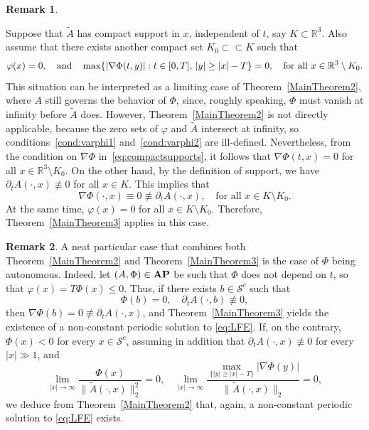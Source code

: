 \documentclass{article}
\newcommand{\R}{\mathbb{R}}
\newcommand{\boS}{\mathcal{S}}
\newcommand{\AP}{\textnormal{\textbf{AP}}}
\theoremstyle{definition}
\newtheorem{remark}{Remark}[section]
\begin{document}
\begin{remark}\label{Rem-Compact support}

Suppose that $\tilde A$ has compact support in $x$, independent of $t$, say $K \subset \mathbb{R}^3$. Also assume that there exists another compact set $K_0 \subset\subset K$ such that
\begin{equation}\label{eq:compactsupports}
\varphi(x) = 0, \quad\hbox{and}\quad \max\{|\nabla\Phi(t, y)| : t \in [0, T],\, |y| \geq |x| - T\} = 0,\quad\hbox{for all }x\in\R^3\setminus K_0.
\end{equation}
This situation can be interpreted as a limiting case of Theorem~\ref{MainTheorem2}, where $A$ still governs the behavior of $\Phi$, since, roughly speaking, $\Phi$ must vanish at infinity before $\tilde A$ does. However, Theorem~\ref{MainTheorem2} is not directly applicable, because the zero sets of $\varphi$ and $\tilde A$ intersect at infinity, so conditions~\eqref{cond:varphi1} and~\eqref{cond:varphi2} are ill-defined. Nevertheless, from the condition on $\nabla\Phi$ in~\eqref{eq:compactsupports}, it follows that $\nabla\Phi(t, x) = 0$ for all $x \in \mathbb{R}^3 \setminus K_0$. On the other hand, by the definition of support, we have $\partial_t A(\cdot, x) \not\equiv 0$ for all $x \in K$. This implies that
\[
\nabla\Phi(\cdot, x) \equiv 0 \not\equiv \partial_t A(\cdot, x), \quad \text{for all } x \in K \setminus K_0.
\]
At the same time, $\varphi(x) = 0$ for all $x \in K \setminus K_0$. Therefore, Theorem~\ref{MainTheorem3} applies in this case.
\end{remark}


\begin{remark}

A neat particular case that combines both Theorem~\ref{MainTheorem2} and Theorem~\ref{MainTheorem3} is the case of $\Phi$ being autonomous. Indeed, let $(A,\Phi)\in\AP$ be such that $\Phi$ does not depend on $t$, so that $\varphi(x)=T\Phi(x)\leq 0$. Thus, if there exists $b\in\boS^c$ such that 
\[\Phi(b)=0,\quad \partial_t A(\cdot,b)\not\equiv 0,\]
then $\nabla\Phi(b)=0\not\equiv\partial_t A(\cdot,x)$, and Theorem~\ref{MainTheorem3} yields the existence of a non-constant periodic solution to \eqref{eq:LFE}. If, on the contrary, $\Phi(x)<0$ for every $x\in\boS^c$, assuming in addition that $\partial_t A(\cdot,x)\not\equiv 0$ for every $|x|\gg 1$, and
        \[\lim_{|x|\to\infty}\frac{\Phi(x)}{\|\tilde A(\cdot,x)\|_2^2}=0,\quad\lim_{|x|\to\infty}\frac{\max_{\{|y|\geq|x|-T\}}|\nabla\Phi(y)|}{\|\tilde A(\cdot,x)\|_2}=0,\]
we deduce from Theorem~\ref{MainTheorem2} that, again, a non-constant periodic solution to \eqref{eq:LFE} exists.
\end{remark}
\end{document}
